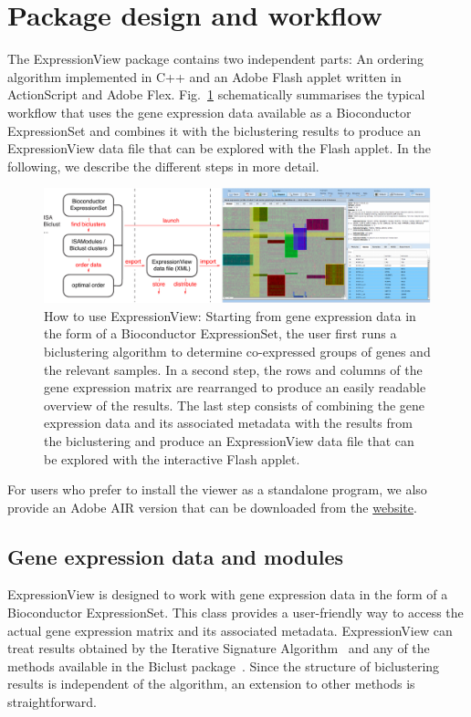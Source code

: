 \documentclass[round]{bioinfo}
\begin{document}
\section{Package design and workflow}
The ExpressionView package contains two independent parts: An ordering
algorithm implemented in C++ and an Adobe Flash applet written in
ActionScript and Adobe Flex. Fig.~\ref{fig:workflow} schematically
summarises the typical workflow that uses the gene expression data
available as a Bioconductor ExpressionSet and combines it with the
biclustering results to produce an ExpressionView data file that can
be explored with the Flash applet. In the following, we describe the
different steps in more detail.
\begin{figure}[!tpb]
\centerline{\includegraphics[width=0.7\linewidth]{fig1-crop}}
\caption{How to use ExpressionView: Starting from gene expression data
  in the form of a Bioconductor ExpressionSet, the user first runs a
  biclustering algorithm to determine co-expressed groups of genes and
  the relevant samples. In a second step, the rows and columns of the gene
  expression matrix are rearranged to produce an easily readable
  overview of the results. The last step consists of combining the
  gene expression data and its associated metadata with the results
  from the biclustering and produce an ExpressionView data file that
  can be explored with the interactive Flash applet.}\label{fig:workflow}
\end{figure}
For users who prefer to install the viewer as a standalone program, we
also provide an Adobe AIR version that can be downloaded from the
\href{http://www.unil.ch/cbg/ExpressionView}{website}.


\subsection{Gene expression data and modules}
ExpressionView is designed to work with gene expression data in the
form of a Bioconductor ExpressionSet. This class provides a
user-friendly way to access the actual gene expression matrix and its
associated metadata. ExpressionView can treat results obtained by the 
Iterative Signature Algorithm~\citep{bergmann03,csardi09} and any of 
the methods available in the Biclust package~\citep{kaiser08}. Since 
the structure of biclustering results is independent of the algorithm, 
an extension to other methods is straightforward.
\end{document}
